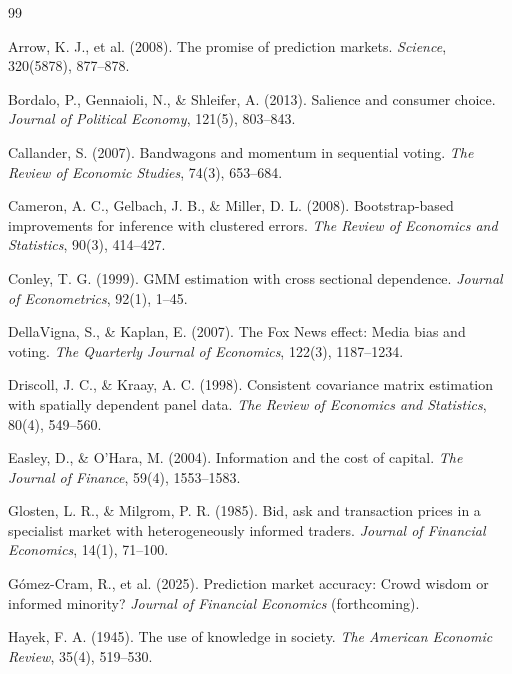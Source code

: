 \documentclass[12pt, a4paper]{article}
\begin{document}
\newpage
\begin{thebibliography}{99}

Arrow, K. J., et al. (2008). The promise of prediction markets. \textit{Science}, 320(5878), 877--878.

Bordalo, P., Gennaioli, N., \& Shleifer, A. (2013). Salience and consumer choice. \textit{Journal of Political Economy}, 121(5), 803--843.

Callander, S. (2007). Bandwagons and momentum in sequential voting. \textit{The Review of Economic Studies}, 74(3), 653--684.

Cameron, A. C., Gelbach, J. B., \& Miller, D. L. (2008). Bootstrap-based improvements for inference with clustered errors. \textit{The Review of Economics and Statistics}, 90(3), 414--427.

Conley, T. G. (1999). GMM estimation with cross sectional dependence. \textit{Journal of Econometrics}, 92(1), 1--45.

DellaVigna, S., \& Kaplan, E. (2007). The Fox News effect: Media bias and voting. \textit{The Quarterly Journal of Economics}, 122(3), 1187--1234.

Driscoll, J. C., \& Kraay, A. C. (1998). Consistent covariance matrix estimation with spatially dependent panel data. \textit{The Review of Economics and Statistics}, 80(4), 549--560.

Easley, D., \& O'Hara, M. (2004). Information and the cost of capital. \textit{The Journal of Finance}, 59(4), 1553--1583.

Glosten, L. R., \& Milgrom, P. R. (1985). Bid, ask and transaction prices in a specialist market with heterogeneously informed traders. \textit{Journal of Financial Economics}, 14(1), 71--100.

G\'omez-Cram, R., et al. (2025). Prediction market accuracy: Crowd wisdom or informed minority? \textit{Journal of Financial Economics} (forthcoming).

Hayek, F. A. (1945). The use of knowledge in society. \textit{The American Economic Review}, 35(4), 519--530.


\end{thebibliography}
\end{document}

